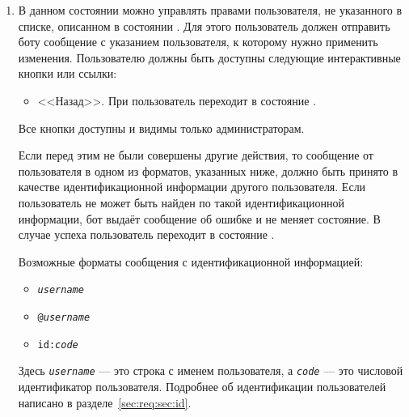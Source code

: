 \begin{enumerate}
            \item \label{itm:req:ui:states:user-privs-unlisted}

                В данном состоянии можно управлять правами пользователя, не указанного в списке,
                описанном в состоянии
                \hyperref[itm:req:ui:states:user-privs]
                {}.
                Для этого пользователь должен отправить боту сообщение с указанием пользователя,
                к которому нужно применить изменения.
                Пользователю должны быть доступны следующие интерактивные кнопки или ссылки:
                \begin{itemize}
                    \item
                        <<Назад>>.
                        При  пользователь переходит в состояние
                        \hyperref[itm:req:ui:states:user-privs]
                        {}.
                \end{itemize}

                Все кнопки доступны и видимы только администраторам.

                Если перед этим не были совершены другие действия, то сообщение от пользователя
                в одном из форматов, указанных ниже, должно быть принято в качестве идентификационной
                информации другого пользователя. Если пользователь не может быть найден по такой
                идентификационной информации, бот выдаёт сообщение об ошибке и не меняет состояние.
                В случае успеха пользователь переходит в состояние
                \hyperref[itm:req:ui:states:user-privsx]
                {}.

                Возможные форматы сообщения с идентификационной информацией:
                \begin{itemize}
                    \item
                        \texttt{\emph{username}}
                    \item
                        \texttt{@\emph{username}}
                    \item
                        \texttt{id:\emph{code}}
                \end{itemize}
                Здесь \texttt{\emph{username}} --- это строка с именем пользователя, а
                \texttt{\emph{code}} --- это числовой идентификатор пользователя. Подробнее
                об идентификации пользователей написано в разделе~\ref{sec:req:sec:id}.


\end{enumerate}
